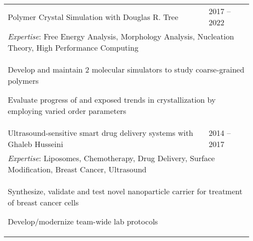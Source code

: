 \documentclass[letterpaper,11pt]{article}
\begin{document}
\begin{tabular}{@{}p{}l@{}}
  Polymer Crystal Simulation with Douglas R. Tree & 2017 -- 2022 \\
  \multicolumn{2}{p{\textwidth}}{\textit{Expertise}: Free Energy Analysis, Morphology Analysis, Nucleation Theory, High Performance Computing} \\
  \multicolumn{2}{p{\textwidth}}{
    \begin{tabitemize} 
      \item Develop and maintain 2 molecular simulators to study coarse-grained polymers
      \item Evaluate progress of and exposed trends in crystallization by employing varied order parameters
    \end{tabitemize}
  }  \\ 

  Ultrasound-sensitive smart drug delivery systems with Ghaleb Husseini & 2014 -- 2017 \\
  \multicolumn{2}{p{\textwidth}}{\textit{Expertise}: Liposomes, Chemotherapy, Drug Delivery, Surface Modification, Breast Cancer, Ultrasound} \\
  \multicolumn{2}{p{\textwidth}}{
    \begin{tabitemize} 
      \item Synthesize, validate and test novel nanoparticle carrier for treatment of breast cancer cells
      \item Develop/modernize team-wide lab protocols
    \end{tabitemize}}\\
\end{tabular} \\
\egroup
\setlength\extrarowheight{1pt}

\vspace{-0.8cm}

\begin{refsection}[articles]
  \nocite{*}
  \setlength\bibitemsep{0pt}
  \printbibliography[resetnumbers=true,type=article,title={Publications},heading=fix]
\end{refsection}
\end{document}
